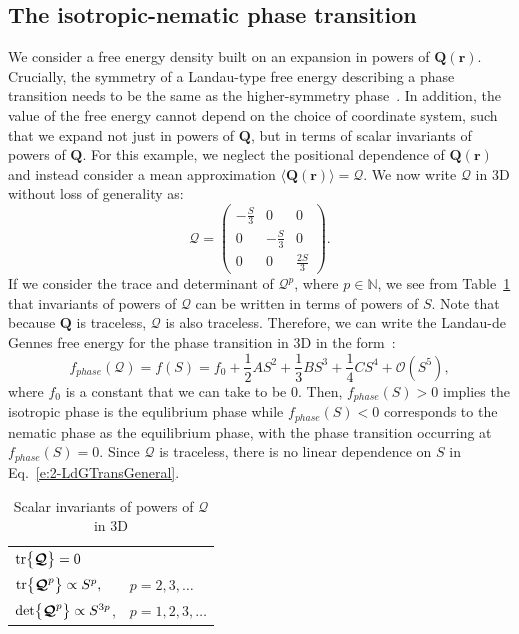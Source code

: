 \subsection{The isotropic-nematic phase transition}
We consider a free energy density built on an expansion in powers of $\mathbf{Q}(\mathbf{r})$.
Crucially, the symmetry of a Landau-type free energy describing a phase transition needs to be the same as the higher-symmetry phase~\cite{RN33,RN175}.
In addition, the value of the free energy cannot depend on the choice of coordinate system, such that we expand not just in powers of $\mathbf{Q}$, but in terms of scalar invariants of powers of $\mathbf{Q}$.
For this example, we neglect the positional dependence of $\mathbf{Q}(\mathbf{r})$ and instead consider a mean approximation $\langle \mathbf{Q}(\mathbf{r}) \rangle = \bm{\mathcal{Q}}$.
We now write $\bm{\mathcal{Q}}$ in 3D without loss of generality as:
\begin{equation}
  \bm{\mathcal{Q}} =
    \begin{pmatrix}
        -\frac{S}{3} & 0 & 0 \\
        0 & -\frac{S}{3} & 0 \\
        0 & 0 & \frac{2S}{3}
    \end{pmatrix}.
\end{equation}
If we consider the trace and determinant of $\bm{\mathcal{Q}}^p$, where $p \in \mathbb{N}$, we see from Table~\ref{t:2-powersQ} that invariants of powers of $\bm{\mathcal{Q}}$ can be written in terms of powers of $S$.
Note that because $\mathbf{Q}$ is traceless, $\bm{\mathcal{Q}}$ is also traceless.
Therefore, we can write the Landau-de Gennes free energy for the phase transition in 3D in the form~\cite{RN33,RN175}:
\begin{equation}
  f_{phase}(\bm{\mathcal{Q}}) = f(S) = f_0 + \frac{1}{2}A S^2 + \frac{1}{3}B S^3 + \frac{1}{4}C S^4 + \mathcal{O} \left (S^5 \right ),\label{e:2-LdGTransGeneral}
\end{equation}
where $f_0$ is a constant that we can take to be $0$.
Then, $f_{phase}(S) > 0$ implies the isotropic phase is the equlibrium phase while $f_{phase}(S) < 0$ corresponds to the nematic phase as the equilibrium phase, with the phase transition occurring at $f_{phase}(S) = 0$.
Since $\bm{\mathcal{Q}}$ is traceless, there is no linear dependence on $S$ in Eq.~\ref{e:2-LdGTransGeneral}.
\begin{table}[t]
  \centering
  \caption{Scalar invariants of powers of $\bm{\mathcal{Q}}$ in 3D}
  \label{t:2-powersQ}
  \begin{tabular}{|l l|}
    \hline
    $\textup{tr} \big \{ \bm{\mathcal{Q}} \big \} = 0$ & \\
    $\textup{tr} \big \{ \bm{\mathcal{Q}}^p \big \} \propto S^p,$ & $p = 2,3, \dots$ \\
    $\textup{det} \big \{ \bm{\mathcal{Q}}^p \big \} \propto S^{3p}$, & $p = 1,2,3,\dots$ \\
    \hline
  \end{tabular}
\end{table}
